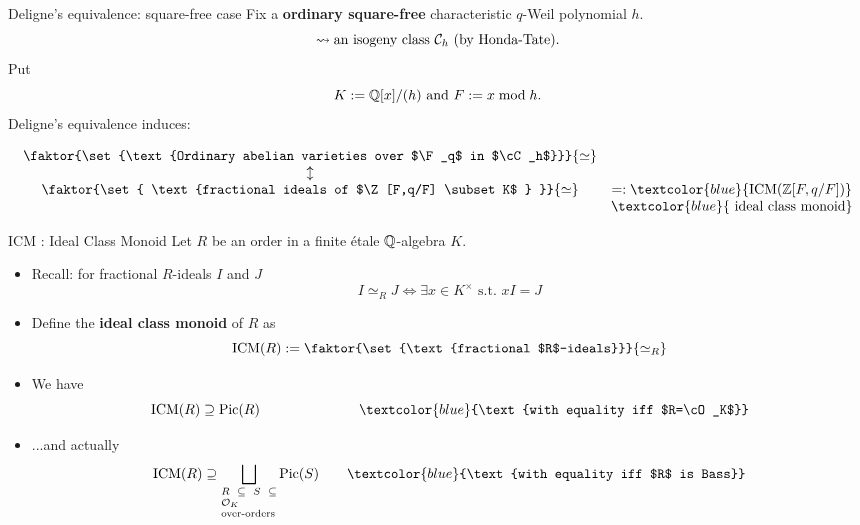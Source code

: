 \documentclass{beamer}
\begin{document}
\begin{frame}{ Deligne's equivalence: square-free case}
Fix a \textbf{ordinary square-free} characteristic $q$-Weil polynomial $h$.\\
\[\rightsquigarrow \text{an isogeny class ${\mathcal C}_h$ (by Honda-Tate)}.\]
\pause Put 
\[K := \mathbb{Q}[x]/(h) \text{ and } F:= x \bmod h. \]
\pause Deligne's equivalence induces:
\begin{theorem}[M.]
\[\begin{array}{cc}
\faktor{\set{\text{Ordinary abelian varieties over $\F_q$ in $\cC_h$}}}{\simeq} & \\
\updownarrow & \\
\faktor{\set{ \text{fractional ideals of $\Z[F,q/F] \subset K$ } }}{\simeq} & =:\textcolor{blue}{\ICM(\Z[F,q/F])}\\ 
  & \textcolor{blue}{\text{ ideal class monoid} }
  \end{array}\]
\end{theorem}
\end{frame}

\begin{frame}{ICM : Ideal Class Monoid}
Let $R$ be an order in a finite \'etale  $\mathbb{Q}$-algebra $K$.
\begin{itemize}
   \pause \item Recall: for fractional $R$-ideals $I$ and $J$
\[ I\simeq_R J \Longleftrightarrow \exists x \in K^\times \text{ s.t.~} xI=J \]
   \pause \item Define the \textbf{ideal class monoid} of $R$ as
\[\ICM(R) := \faktor{\set{\text{fractional $R$-ideals}}}{\simeq_R}\]

   \pause \item We have
   \[ \ICM(R) \supseteq \Pic(R) \hspace{2.5 cm} \textcolor{blue}{\text{with equality iff $R=\cO_K$}} \]
   \pause \item ...and actually
   \[ \ICM(R) \supseteq \bigsqcup_{\scriptsize\parbox{5 em}{$R\subseteq S \subseteq \cO_K$\\over-orders}}\Pic(S) \qquad \textcolor{blue}{\text{with equality iff $R$ is Bass}} \]
\end{itemize}
\end{frame}
\end{document}
